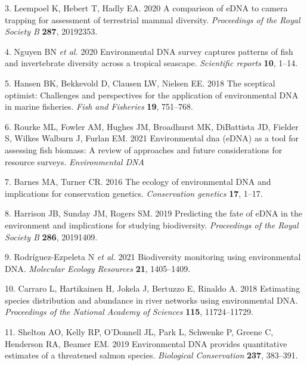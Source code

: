 \documentclass[
]{article}
\begin{document}
\leavevmode\hypertarget{ref-leempoel2020comparison}{}%
3. Leempoel K, Hebert T, Hadly EA. 2020 A comparison of eDNA to camera
trapping for assessment of terrestrial mammal diversity.
\emph{Proceedings of the Royal Society B} \textbf{287}, 20192353.

\leavevmode\hypertarget{ref-nguyen2020environmental}{}%
4. Nguyen BN \emph{et al.} 2020 Environmental DNA survey captures
patterns of fish and invertebrate diversity across a tropical seascape.
\emph{Scientific reports} \textbf{10}, 1--14.

\leavevmode\hypertarget{ref-hansen2018sceptical}{}%
5. Hansen BK, Bekkevold D, Clausen LW, Nielsen EE. 2018 The sceptical
optimist: Challenges and perspectives for the application of
environmental DNA in marine fisheries. \emph{Fish and Fisheries}
\textbf{19}, 751--768.

\leavevmode\hypertarget{ref-rourke2021environmental}{}%
6. Rourke ML, Fowler AM, Hughes JM, Broadhurst MK, DiBattista JD,
Fielder S, Wilkes Walburn J, Furlan EM. 2021 Environmental dna (eDNA) as
a tool for assessing fish biomass: A review of approaches and future
considerations for resource surveys. \emph{Environmental DNA}

\leavevmode\hypertarget{ref-barnes2016ecology}{}%
7. Barnes MA, Turner CR. 2016 The ecology of environmental DNA and
implications for conservation genetics. \emph{Conservation genetics}
\textbf{17}, 1--17.

\leavevmode\hypertarget{ref-harrison2019predicting}{}%
8. Harrison JB, Sunday JM, Rogers SM. 2019 Predicting the fate of eDNA
in the environment and implications for studying biodiversity.
\emph{Proceedings of the Royal Society B} \textbf{286}, 20191409.

\leavevmode\hypertarget{ref-rodriguez2021biodiversity}{}%
9. Rodr\'{i}guez-Ezpeleta N \emph{et al.} 2021 Biodiversity monitoring using
environmental DNA. \emph{Molecular Ecology Resources} \textbf{21},
1405--1409.

\leavevmode\hypertarget{ref-carraro2018estimating}{}%
10. Carraro L, Hartikainen H, Jokela J, Bertuzzo E, Rinaldo A. 2018
Estimating species distribution and abundance in river networks using
environmental DNA. \emph{Proceedings of the National Academy of
Sciences} \textbf{115}, 11724--11729.

\leavevmode\hypertarget{ref-shelton2019biocons}{}%
11. Shelton AO, Kelly RP, O'Donnell JL, Park L, Schwenke P, Greene C,
Henderson RA, Beamer EM. 2019 Environmental DNA provides quantitative
estimates of a threatened salmon species. \emph{Biological Conservation}
\textbf{237}, 383--391.
\end{document}
